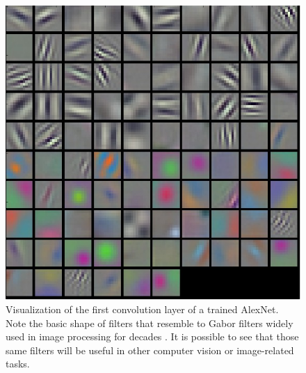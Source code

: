     \begin{figure}[!htbp]
      \centering
      \includegraphics[scale=0.4]{images/sota/filt1.jpeg}
      \caption[Convolution Neural Networks filters shape]{Visualization of the first convolution layer of a trained AlexNet. Note the basic shape of filters that resemble to Gabor filters widely used in image processing for decades \citep{fogel1989gabor,jain1991unsupervised}. It is possible to see that those same filters will be useful in other computer vision or image-related tasks.}
      \label{fig:AlexNet_filters}
    \end{figure}

